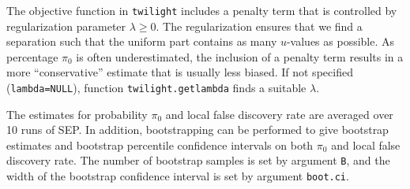 \documentclass[11pt,a4paper,fleqn]{report}
\newcommand{\Rfunction}[1]{{\texttt{#1}}}
\newcommand{\Rfunarg}[1]{{\texttt{#1}}}
\begin{document}
The objective function in \Rfunction{twilight} includes a penalty term that is controlled by regularization parameter $\lambda \geq 0$. The regularization ensures that we find a separation such that the uniform part contains as many $u$-values as possible. As percentage $\pi_0$ is often underestimated, the inclusion of a penalty term results in a more ``conservative'' estimate that is usually less biased. If not specified (\Rfunarg{lambda=NULL}), function \Rfunction{twilight.getlambda} finds a suitable $\lambda$.

The estimates for probability $\pi_0$ and local false discovery rate are averaged over 10 runs of SEP. In addition, bootstrapping can be performed to give bootstrap estimates and bootstrap percentile confidence intervals on both $\pi_0$ and local false discovery rate. The number of bootstrap samples is set by argument \Rfunarg{B}, and the width of the bootstrap confidence interval is set by argument \Rfunarg{boot.ci}.
\end{document}
